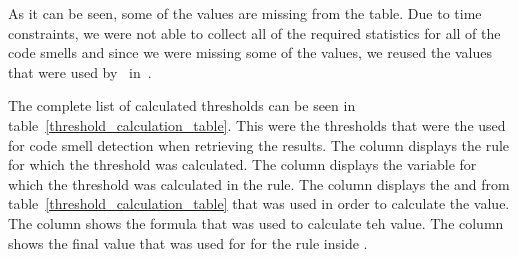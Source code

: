 As it can be seen, some of the values are missing from the table.
Due to time constraints, we were not able to collect all of the required statistics for all of the code smells
and since we were missing some of the values, we reused the values that were used by~\citeauthor{ios_code_smell_paper} in~\cite{ios_code_smell_paper}.

The complete list of calculated thresholds can be seen in table~\ref{threshold_calculation_table}.
This were the thresholds that were the used for code smell detection when retrieving the results.
The column  displays the rule for which the threshold was calculated.
The column  displays the variable for which the threshold was calculated in the rule.
The column  displays the  and  from table~\ref{threshold_calculation_table}
that was used in order to calculate the value.
The column  shows the formula that was used to calculate teh value.
The column  shows the final value that was used for  for the rule inside .

